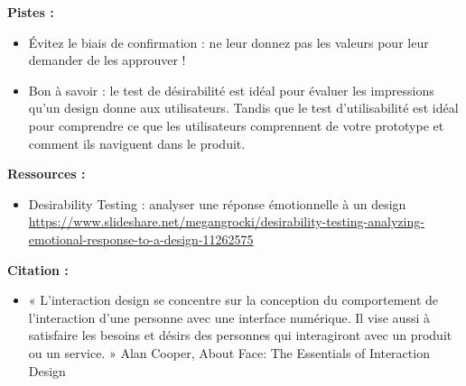 \textbf{Pistes :}

\begin{itemize}
\item Évitez le biais de confirmation : ne leur donnez pas les valeurs pour leur demander de les approuver !
\item Bon à savoir : le test de désirabilité est idéal pour évaluer les impressions qu'un design donne aux utilisateurs. Tandis que le test d'utilisabilité est idéal pour comprendre ce que les utilisateurs comprennent de votre prototype et comment ils naviguent dans le produit.
\end{itemize}

\textbf{Ressources :}

\begin{itemize}
\item Desirability Testing : analyser une réponse émotionnelle à un design \url{https://www.slideshare.net/megangrocki/desirability-testing-analyzing-emotional-response-to-a-design-11262575}
\end{itemize}

\textbf{Citation :}

\begin{itemize}
\item « L'interaction design se concentre sur la conception du comportement de l'interaction d'une personne avec une interface numérique. Il vise aussi à satisfaire les besoins et désirs des personnes qui interagiront avec un produit ou un service. » Alan Cooper, About Face: The Essentials of Interaction Design
\end{itemize}

